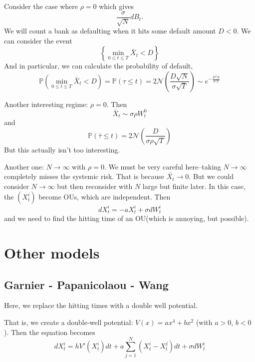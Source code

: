 Consider the case where $\rho=0$ which gives
\begin{equation}
	\frac{\sigma}{\sqrt{N}}dB_t.
\end{equation}
We will count a bank as defaulting when it hits some default amount $D<0$. We can consider the event
\begin{equation}
	\left\{ \min_{0\leq t \leq T} \bar{X}_t < D \right\}
\end{equation}
And in particular, we can calculate the probability of default,
\begin{equation}
	\mathbb{P}(\min_{0\leq t \leq T} \bar{X}_t < D) 
	= \mathbb{P}(\tau \leq t) 
	= 2\mathcal{N}(\frac{D\sqrt{N}}{\sigma\sqrt{T}})
	\sim e^{-\frac{D^2 N}{\sigma^2 T}}
\end{equation}

Another interesting regime: $\rho=0$. Then
\begin{equation}
	\bar{X}_t \sim \sigma \rho W_t^0
\end{equation}
and
\begin{equation}
	\mathbb{P}(\bar{\tau} \leq t) = 2 \mathcal{N}(\frac{D}{\sigma \rho \sqrt{T}})
\end{equation}
But this actually isn't too interesting.

Another one: $N\to \infty$ with $\rho=0$. We must be very careful here--taking $N\to\infty$ completely misses the systemic risk. That is because $\bar{X_t}\to 0$. But we could consider $N\to\infty$ but then reconsider with $N$ large but finite later. In this case, the $(X_t^i)$ become OUs, which are independent.  Then
\begin{equation}
	d X_t^i = -a X_t^i + \sigma dW_t^i
\end{equation}
and we need to find the hitting time of an OU(which is annoying, but possible).


\section{Other models}
\subsection{Garnier - Papanicolaou - Wang}
Here, we replace the hitting times with a double well potential.

That is, we create a double-well potential: $V(x) = a x^4 + b x^2$ (with $a>0$, $b<0$). Then the equation becomes
\begin{equation}
	dX_t^i = h V'(X_t^i) dt + a \sum_{j=1}^N (X_t^i - X_t^j) dt + \sigma dW^i_t
\end{equation}


